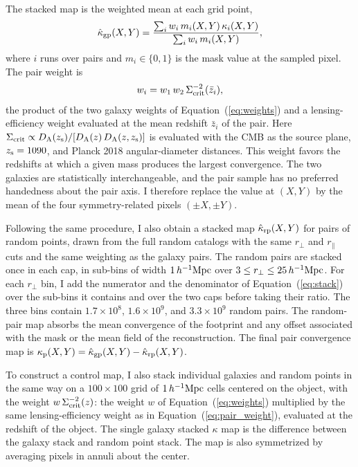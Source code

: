 \documentclass[11pt,letterpaper]{article}
\newcommand{\hinvMpc}{h^{-1}{\rm Mpc}}
\begin{document}
The stacked map is the weighted mean at each grid point,
\begin{equation}
  \hat\kappa_{\rm gp}(X,Y) = \frac{\sum_{i} w_{i}\,m_{i}(X,Y)\,\kappa_{i}(X,Y)}
                         {\sum_{i} w_{i}\,m_{i}(X,Y)},
  \label{eq:stack}
\end{equation}
where $i$ runs over pairs and $m_{i}\in\{0,1\}$ is the mask value at
the sampled pixel. The pair weight is
\begin{equation}
  w_{i} = w_{1}\,w_{2}\,\Sigma_{\rm crit}^{-2}(\bar z_{i}),
  \label{eq:pair_weight}
\end{equation}
the product of the two galaxy weights of Equation~(\ref{eq:weights}) and a
lensing-efficiency weight evaluated at the mean redshift $\bar z_{i}$ of the
pair. Here
$\Sigma_{\rm crit}\propto D_{\rm A}(z_{\rm s})/[D_{\rm A}(z)\,D_{\rm A}(z,z_{\rm s})]$
is evaluated with the CMB as the source plane, $z_{\rm s}=1090$, and
Planck 2018 angular-diameter distances. This weight favors the redshifts at
which a given mass produces the largest convergence. The two galaxies are statistically interchangeable, and
the pair sample has no preferred handedness about the pair axis. I therefore
replace the value at $(X,Y)$ by the mean of the four symmetry-related pixels
$(\pm X,\pm Y)$.

Following the same procedure, I also obtain a stacked map $\hat\kappa_{\rm rp}(X,Y)$ for pairs of random points, drawn from the full random catalogs with the same $r_{\perp}$ and $r_{\parallel}$ cuts and the same weighting as the galaxy pairs. The random pairs are stacked once in each cap, in sub-bins of width $1\,\hinvMpc$ over $3\leq r_{\perp}\leq25\,\hinvMpc$. For each $r_{\perp}$ bin, I add the numerator and the denominator of Equation~(\ref{eq:stack}) over the sub-bins it contains and over the two caps before taking their ratio. The three bins contain $1.7\times10^{8}$, $1.6\times10^{9}$, and $3.3\times10^{9}$ random pairs. The
random-pair map absorbs the mean convergence of the footprint and any offset associated with the mask or the mean field of the reconstruction. The final pair convergence map is $\kappa_{\rm p}(X,Y) = \hat\kappa_{\rm gp}(X,Y) -\hat\kappa_{\rm rp}(X,Y)$.

To construct a control map, I also stack individual galaxies and random
points in the same way on a $100\times100$ grid of $1\,\hinvMpc$ cells
centered on the object, with the weight $w\,\Sigma_{\rm crit}^{-2}(z)$:
the weight $w$ of Equation~(\ref{eq:weights}) multiplied by the same
lensing-efficiency weight as in Equation~(\ref{eq:pair_weight}), evaluated
at the redshift of the object. The single galaxy stacked
$\kappa$ map is the difference between the galaxy stack and random point
stack. The map is also symmetrized by averaging pixels in annuli about the
center.
\end{document}

